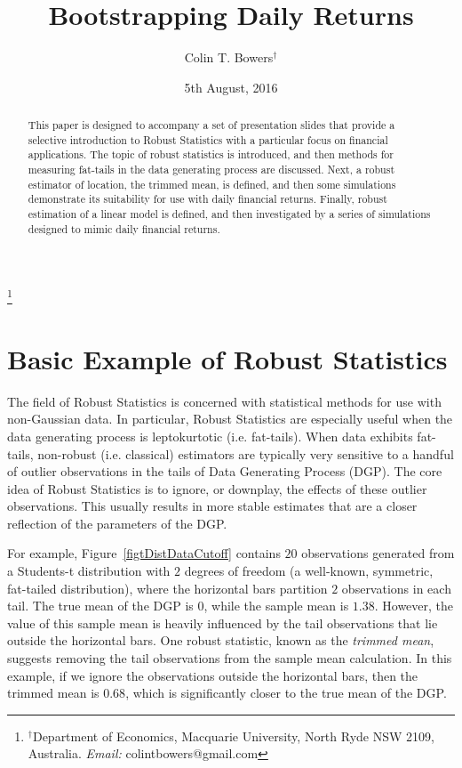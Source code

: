 \documentclass[12pt,a4paper]{amsart}
\begin{document}
\title{Bootstrapping Daily Returns}

\author[C. Bowers]{Colin T. Bowers$^\dag$}
\thanks{$^\dag$Department of Economics, Macquarie University, North Ryde NSW 2109, Australia.  \textit{Email:} colintbowers@gmail.com}


\date{5th August, 2016}

\maketitle

\begin{abstract}
This paper is designed to accompany a set of presentation slides that provide a selective introduction to Robust Statistics with a particular focus on financial applications. The topic of robust statistics is introduced, and then methods for measuring fat-tails in the data generating process are discussed. Next, a robust estimator of location, the trimmed mean, is defined, and then some simulations demonstrate its suitability for use with daily financial returns. Finally, robust estimation of a linear model is defined, and then investigated by a series of simulations designed to mimic daily financial returns.
\end{abstract}

\section{Basic Example of Robust Statistics}\label{secBasicExample}

The field of Robust Statistics is concerned with statistical methods for use with non-Gaussian data. In particular, Robust Statistics are especially useful when the data generating process is leptokurtotic (i.e. fat-tails). When data exhibits fat-tails, non-robust (i.e. classical) estimators are typically very sensitive to a handful of outlier observations in the tails of Data Generating Process (DGP). The core idea of Robust Statistics is to ignore, or downplay, the effects of these outlier observations. This usually results in more stable estimates that are a closer reflection of the parameters of the DGP.

For example, Figure~\ref{figtDistDataCutoff} contains $20$ observations generated from a Students-t distribution with $2$ degrees of freedom (a well-known, symmetric, fat-tailed distribution), where the horizontal bars partition $2$ observations in each tail. The true mean of the DGP is $0$, while the sample mean is $1.38$. However, the value of this sample mean is heavily influenced by the tail observations that lie outside the horizontal bars. One robust statistic, known as the \emph{trimmed mean}, suggests removing the tail observations from the sample mean calculation. In this example, if we ignore the observations outside the horizontal bars, then the trimmed mean is $0.68$, which is significantly closer to the true mean of the DGP.
\end{document}
